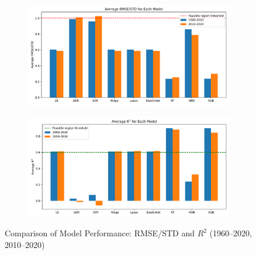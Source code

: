 \documentclass[12pt]{article}
\begin{document}
\begin{figure}[h]
    \centering
    \begin{subfigure}[b]{0.48\textwidth}
        \centering
        \includegraphics[width=\linewidth]{Average_RMSE_STD_figure1.png}
        \label{fig:rmse_std}
    \end{subfigure}
    \hfill
    \begin{subfigure}[b]{0.48\textwidth}
        \centering
        \includegraphics[width=\linewidth]{Average_R2_figure1.png}
        \label{fig:r2}
    \end{subfigure}
    \caption{Comparison of Model Performance: RMSE/STD and $R^2$ (1960–2020, 2010–2020)}
    \label{fig:model_compare_1}
\end{figure}
\end{document}
